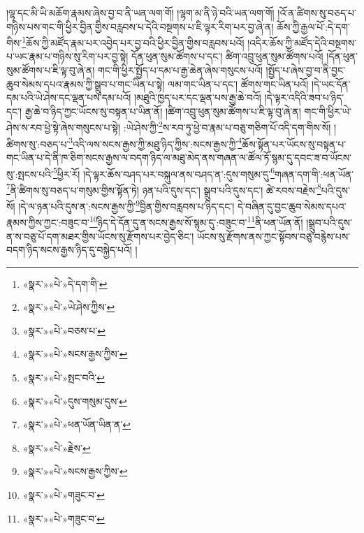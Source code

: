 །ལྷ་དང་མི་ཡི་མཆོག་རྣམས་ཞེས་བྱ་བ་ནི་ཡན་ལག་གོ། །ལྷག་མ་ནི་ཉེ་བའི་ཡན་ལག་གོ། །འོ་ན་ཚིགས་སུ་བཅད་པ་གཉིས་པས་གང་གི་ཕྱིར་བྱིན་གྱིས་བརླབས་པ་དེའི་བསྔགས་པ་ཇི་ལྟར་རིག་པར་བྱ་ཞེ་ན། ཆོས་ཀྱི་རྒྱལ་པོ་:དེ་དག་གིས་\footnote{«སྣར་»«པེ་»དེ་དག་གི་}ཆོས་ཀྱི་མཛོད་རྣམ་པར་འབྱེད་པར་བྱ་བའི་ཕྱིར་བྱིན་གྱིས་བརླབས་པའོ། །འདིར་ཆོས་ཀྱི་མཛོད་དེའི་བསྔགས་པ་ཡང་རྣམ་པ་གཉིས་སུ་རིག་པར་བྱ་སྟེ། དོན་ཕུན་སུམ་ཚོགས་པ་དང་། ཚིག་འབྲུ་ཕུན་སུམ་ཚོགས་པའོ། །དོན་ཕུན་སུམ་ཚོགས་པ་ཇི་ལྟ་བུ་ཞེ་ན། གང་གི་ཕྱིར་སྤྱོད་པ་དམ་པ་རྒྱ་ཆེན་ཞེས་གསུངས་པའོ། །སྤྱོད་པ་ཞེས་བྱ་བ་ནི་བྱང་ཆུབ་སེམས་དཔའ་རྣམས་ཀྱི་སྒྲུབ་པ་གང་ཡིན་པ་སྟེ། ལམ་གང་ཡིན་པ་དང་། ཚོགས་གང་ཡིན་པའོ། །དེ་ཡང་དོན་དམ་པའི་ཡེ་ཤེས་དང་ལྡན་པས་དམ་པའོ། །མཐུའི་ཁྱད་པར་དང་ལྡན་པས་རྒྱ་ཆེ་བའོ། །དེ་ལྟར་འདིའི་ཟབ་པ་ཉིད་དང་། རྒྱ་ཆེ་བ་ཉིད་ཀྱང་ཡོངས་སུ་བསྟན་པ་ཡིན་ནོ། །ཚིག་འབྲུ་ཕུན་སུམ་ཚོགས་པ་ཇི་ལྟ་བུ་ཞེ་ན། གང་གི་ཕྱིར་ཡེ་ཤེས་ས་རབ་ཕྱེ་སྟེ་ཞེས་གསུངས་པ་སྟེ། :ཡེ་ཤེས་ཀྱི་\footnote{«སྣར་»«པེ་»ཡེ་ཤེས་ཀྱིས་}ས་རབ་ཏུ་ཕྱེ་བ་རྣམ་པ་བཅུ་གཅིག་པོ་འདི་དག་གིས་སོ། །ཚིགས་སུ་:བཅད་པ་\footnote{«སྣར་»«པེ་»བཅས་པ་}འདི་ལས་སངས་རྒྱས་ཀྱི་མཐུ་ཉིད་ཀྱིས་:སངས་རྒྱས་ཀྱི་\footnote{«སྣར་»«པེ་»སངས་རྒྱས་ཀྱིས་}ཆོས་སྟོན་པར་ཡོངས་སུ་བསྟན་པ་གང་ཡིན་པ་དེ་ནི་ཁ་ཅིག་སངས་རྒྱས་ལ་བདག་ཉིད་ལ་མཐུ་མེད་ནས་གཞན་ལ་ཚོལ་ཏོ་སྙམ་དུ་དབང་ཟ་བ་ཡོངས་སུ་:སྤངས་པའི་\footnote{«སྣར་»«པེ་»སྤང་བའི་}ཕྱིར་རོ། །དེ་ལྟར་ཆོས་བཤད་པར་བསྐུལ་ནས་བཤད་ན་:དུས་གསུམ་དུ་\footnote{«སྣར་»«པེ་»དུས་གསུམ་དུས་}གཞན་དག་གི་:ཕན་ཡོན་\footnote{«སྣར་»«པེ་»ཕན་ཡོན་ཡིན་ན་}ནི་ཚིགས་སུ་བཅད་པ་གསུམ་གྱིས་སྟོན་ཏེ། ཉན་པའི་དུས་དང་། སྒྲུབ་པའི་དུས་དང་། ཚེ་རབས་བརྗེས་\footnote{«སྣར་»«པེ་»རྗེས་}པའི་དུས་སོ། །དེ་ལ་ཉན་པའི་དུས་ན་:སངས་རྒྱས་ཀྱི་\footnote{«སྣར་»«པེ་»སངས་རྒྱས་ཀྱིས་}བྱིན་གྱིས་བརླབས་པ་ཉིད་དང་། དེ་བཞིན་དུ་བྱང་ཆུབ་སེམས་དཔའ་རྣམས་ཀྱིས་ཀྱང་:བཟུང་བ་\footnote{«སྣར་»«པེ་»གཟུང་བ་}ཉིད་དེ་དོན་དུ་ན་སངས་རྒྱས་སོ་སྙམ་དུ་:བཟུང་བ་\footnote{«སྣར་»«པེ་»གཟུང་བ་}ནི་ཕན་ཡོན་ནོ། །སྒྲུབ་པའི་དུས་ན་ས་བཅུ་པོ་དག་མཐར་གྱིས་ཡོངས་སུ་རྫོགས་པར་བྱེད་ཅིང་། ཡོངས་སུ་རྫོགས་ནས་ཀྱང་སྟོབས་བཅུ་བརྙེས་པས་བདག་ཉིད་སངས་རྒྱས་ཉིད་དུ་བསྐྱེད་པའོ། །
